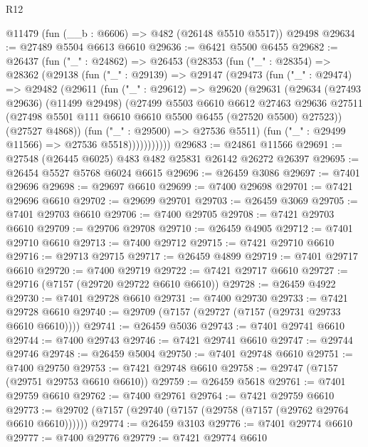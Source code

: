 \begin{lexlean}{R12}
\begin{coremodule}
    @11479
    (fun (__b : @6606) => @482 (@26148 @5510 @5517))
    @29498
@29634 := @27489 @5504 @6613 @6610
@29636 := @6421 @5500 @6455
@29682 := @26437
    (fun ("_" : @24862) =>
    @26453
      (@28353
        (fun ("_" : @28354) =>
        @28362
          (@29138
            (fun ("_" : @29139) =>
            @29147
              (@29473
                (fun ("_" : @29474) =>
                @29482
                  (@29611
                    (fun ("_" : @29612) =>
                    @29620
                      (@29631
                        (@29634
                          (@27493 @29636)
                          (@11499 @29498)
                          (@27499
                            @5503
                            @6610
                            @6612
                            @27463
                            @29636
                            @27511
                            (@27498 @5501 @111 @6610 @6610 @5500 @6455 (@27520 @5500) @27523))
                          (@27527 @4868))
                        (fun ("_" : @29500) => @27536 @5511)
                        (fun ("_" : @29499 @11566) => @27536 @5518)))))))))))
@29683 := @24861 @11566
@29691 := @27548 (@26445 @6025) @483 @482 @25831 @26142 @26272 @26397
@29695 := @26454 @5527 @5768 @6024 @6615
@29696 := @26459 @3086
@29697 := @7401 @29696
@29698 := @29697 @6610
@29699 := @7400 @29698
@29701 := @7421 @29696 @6610
@29702 := @29699 @29701
@29703 := @26459 @3069
@29705 := @7401 @29703 @6610
@29706 := @7400 @29705
@29708 := @7421 @29703 @6610
@29709 := @29706 @29708
@29710 := @26459 @4905
@29712 := @7401 @29710 @6610
@29713 := @7400 @29712
@29715 := @7421 @29710 @6610
@29716 := @29713 @29715
@29717 := @26459 @4899
@29719 := @7401 @29717 @6610
@29720 := @7400 @29719
@29722 := @7421 @29717 @6610
@29727 := @29716 (@7157 (@29720 @29722 @6610 @6610))
@29728 := @26459 @4922
@29730 := @7401 @29728 @6610
@29731 := @7400 @29730
@29733 := @7421 @29728 @6610
@29740 := @29709 (@7157 (@29727 (@7157 (@29731 @29733 @6610 @6610))))
@29741 := @26459 @5036
@29743 := @7401 @29741 @6610
@29744 := @7400 @29743
@29746 := @7421 @29741 @6610
@29747 := @29744 @29746
@29748 := @26459 @5004
@29750 := @7401 @29748 @6610
@29751 := @7400 @29750
@29753 := @7421 @29748 @6610
@29758 := @29747 (@7157 (@29751 @29753 @6610 @6610))
@29759 := @26459 @5618
@29761 := @7401 @29759 @6610
@29762 := @7400 @29761
@29764 := @7421 @29759 @6610
@29773 := @29702 (@7157 (@29740 (@7157 (@29758 (@7157 (@29762 @29764 @6610 @6610))))))
@29774 := @26459 @3103
@29776 := @7401 @29774 @6610
@29777 := @7400 @29776
@29779 := @7421 @29774 @6610

\end{coremodule}
\end{lexlean}
